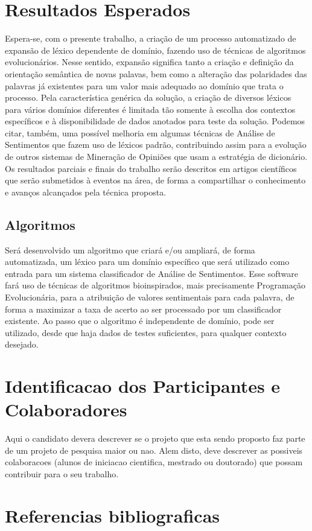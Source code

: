 \documentclass[a4paper,11pt]{article}
\begin{document}
\section{Resultados Esperados}
\label{sec:result}
Espera-se, com o presente trabalho, a criação de um processo automatizado de expansão de léxico dependente de domínio, fazendo uso de técnicas de algoritmos evolucionários. Nesse sentido, expansão significa tanto a criação e definição da orientação semântica de novas palavas, bem como a alteração das polaridades das palavras já existentes para um valor mais adequado ao domínio que trata o processo.
Pela característica genérica da solução, a criação de diversos léxicos para vários domínios diferentes é limitada tão somente à escolha dos contextos específicos e à disponibilidade de dados anotados para teste da solução.
Podemos citar, também, uma possível melhoria em algumas técnicas de Análise de Sentimentos que fazem uso de léxicos padrão, contribuindo assim para a evolução de outros sistemas de Mineração de Opiniões que usam a estratégia de dicionário.
Os resultados parciais e finais do trabalho serão descritos em artigos científicos que serão submetidos à eventos na área, de forma a compartilhar o conhecimento e avanços alcançados pela técnica proposta.

\subsection{Algoritmos} %
Será desenvolvido um algoritmo que criará e/ou ampliará, de forma automatizada, um léxico para um domínio específico que será utilizado como entrada para um sistema classificador de Análise de Sentimentos.
Esse software fará uso de técnicas de algoritmos bioinspirados, mais precisamente Programação Evolucionária, para a atribuição de valores sentimentais para cada palavra, de forma a maximizar a taxa de acerto ao ser processado por um classificador existente.
Ao passo que o algoritmo é independente de domínio, pode ser utilizado, desde que haja dados de testes suficientes, para qualquer contexto desejado.

\section{Identificacao dos Participantes e Colaboradores}
Aqui o candidato devera descrever se o projeto que esta sendo proposto faz parte de um projeto de pesquisa maior ou nao. Alem disto, deve descrever as possiveis colaboracoes (alunos de iniciacao cientifica, mestrado ou doutorado) que possam contribuir para o seu trabalho. 

\section{Referencias bibliograficas}


\end{document}
